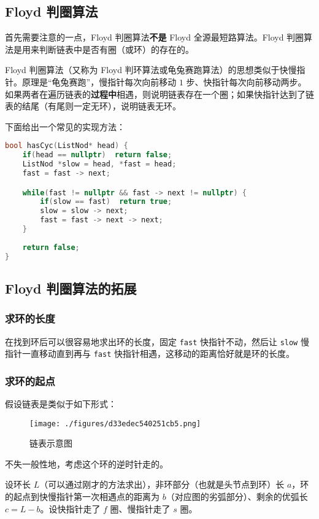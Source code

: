 
\subsection{Floyd 判圈算法}
首先需要注意的一点，Floyd 判圈算法\textbf{不是} Floyd 全源最短路算法。Floyd 判圈算法是用来判断链表中是否有圈（或环）的存在的。

Floyd 判圈算法（又称为 Floyd 判环算法或龟兔赛跑算法）的思想类似于快慢指针。原理是“龟兔赛跑”，慢指针每次向前移动 $1$ 步、快指针每次向前移动两步。如果两者在遍历链表的\textbf{过程中}相遇，则说明链表存在一个圈；如果快指针达到了链表的结尾（有尾则一定无环），说明链表无环。

下面给出一个常见的实现方法：
\begin{lstlisting}[language=cpp]
bool hasCyc(ListNod* head) {
    if(head == nullptr)  return false;
    ListNod *slow = head, *fast = head;
    fast = fast -> next;

    while(fast != nullptr && fast -> next != nullptr) {
        if(slow == fast)  return true;
        slow = slow -> next;
        fast = fast -> next -> next;
    }
    
    return false;
}
\end{lstlisting}

\subsection{Floyd 判圈算法的拓展}
\subsubsection{求环的长度}
在找到环后可以很容易地求出环的长度，固定 \verb`fast` 快指针不动，然后让 \verb`slow` 慢指针一直移动直到再与 \verb`fast` 快指针相遇，这移动的距离恰好就是环的长度。
\subsubsection{求环的起点}
假设链表是类似于如下形式：
\begin{figure}[ht]
\centering
\texttt{[image: ./figures/d33edec540251cb5.png]}
\caption{链表示意图} \label{fig_FloydC_2}
\end{figure}
不失一般性地，考虑这个环的逆时针走的。

设环长 $L$（可以通过刚才的方法求出），非环部分（也就是头节点到环）长 $a$，环的起点到快慢指针第一次相遇点的距离为 $b$（对应图的劣弧部分）、剩余的优弧长 $c = L-b$。设快指针走了 $f$ 圈、慢指针走了 $s$ 圈。

